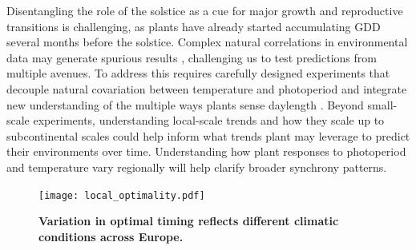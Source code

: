\documentclass[11pt,letter]{article}
\begin{document}
Disentangling the role of the solstice as a cue for major growth and reproductive transitions is challenging, as plants have already started accumulating GDD several months before the solstice.
Complex natural correlations in environmental data may generate spurious results \citep[e.g.,][]{Gao2024}, challenging us to test predictions from multiple avenues. %
To address this requires carefully designed experiments that decouple natural covariation between temperature and photoperiod  \citep{Buonaiuto2023} and integrate new understanding of the multiple ways plants sense daylength \citep{wang2024plants}.  %
Beyond small-scale experiments, understanding local-scale trends and how they scale up to subcontinental scales could help inform what trends plant may leverage to predict their environments over time. Understanding how plant responses to photoperiod and temperature vary regionally will help clarify broader synchrony patterns.

\begin{figure}[h]
\centering
\texttt{[image: local\_optimality.pdf]}
\vspace*{-0.7cm}
\caption{\textbf{Variation in optimal timing reflects different climatic conditions across Europe.}}
\label{fig:localoptimality}
\end{figure}



\end{document}
